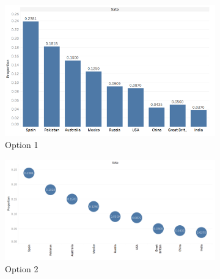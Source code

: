\documentclass[11pt,fleqn]{book} %
\begin{document}
\begin{example}
\begin{figure}[hitb!]
  \centering
  \begin{subfigure}[c]{0.45\linewidth}
    \includegraphics[width=\linewidth]{Pictures/paq9-1.png}
    \caption{Option 1}
    \label{fig:pa1.9-op1}
  \end{subfigure}
  \hfill
  \begin{subfigure}[c]{0.45\linewidth}
    \includegraphics[width=\linewidth]{Pictures/paq9-2.png}
    \caption{Option 2}
    \label{fig:pa1.9-op2}
  \end{subfigure}
  \begin{subfigure}[c]{0.45\linewidth}

\end{subfigure}
\end{figure}
\end{example}
\end{document}
